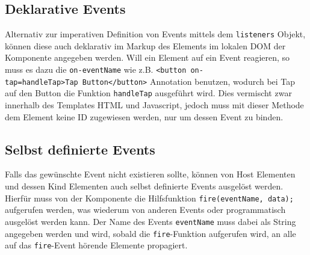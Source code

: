 \subsection{Deklarative Events}\label{deklarative-events}

Alternativ zur imperativen Definition von Events mittels dem \texttt{listeners} Objekt, können diese auch deklarativ im Markup des Elements im lokalen \ac{DOM} der Komponente angegeben werden. Will ein Element auf ein Event reagieren, so muss es dazu die \texttt{on-eventName} wie z.B. \texttt{\textless{}button\ on-tap=\dq handleTap\dq\textgreater{}Tap\ Button\textless{}/button\textgreater{}} Annotation benutzen, wodurch bei Tap auf den Button die Funktion \texttt{handleTap} ausgeführt wird. Dies vermischt zwar innerhalb des Templates \ac{HTML} und Javascript, jedoch muss mit dieser Methode dem Element keine ID zugewiesen werden, nur um dessen Event zu binden.


\subsection{Selbst definierte Events}\label{selbst-definierte-events}

Falls das gewünschte Event nicht existieren sollte, können von Host Elementen und dessen Kind Elementen auch selbst definierte Events ausgelöst werden. Hierfür muss von der Komponente die Hilfsfunktion \texttt{fire(eventName,\ data);} aufgerufen werden, was wiederum von anderen Events oder programmatisch ausgelöst werden kann. Der Name des Events \texttt{eventName} muss dabei als String angegeben werden und wird, sobald die \texttt{fire}-Funktion aufgerufen wird, an alle auf das \texttt{fire}-Event hörende Elemente propagiert.
